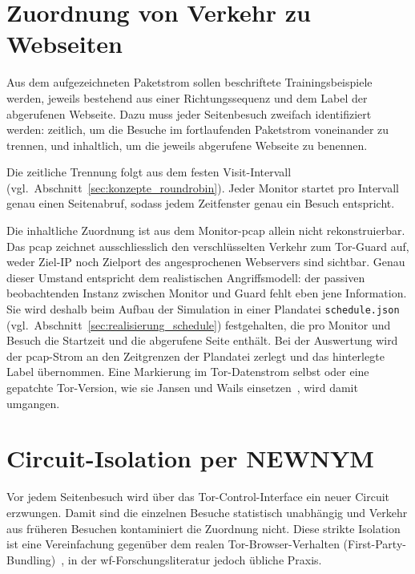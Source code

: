 \section{Zuordnung von Verkehr zu Webseiten}
\label{sec:konzepte_port_class}

Aus dem aufgezeichneten Paketstrom sollen beschriftete Trainingsbeispiele werden, jeweils bestehend aus einer Richtungssequenz und dem Label der abgerufenen Webseite.
Dazu muss jeder Seitenbesuch zweifach identifiziert werden: zeitlich, um die Besuche im fortlaufenden Paketstrom voneinander zu trennen, und inhaltlich, um die jeweils abgerufene Webseite zu benennen.

Die zeitliche Trennung folgt aus dem festen Visit-Intervall (vgl.\ Abschnitt~\ref{sec:konzepte_roundrobin}).
Jeder Monitor startet pro Intervall genau einen Seitenabruf, sodass jedem Zeitfenster genau ein Besuch entspricht.

Die inhaltliche Zuordnung ist aus dem Monitor-\gls{pcap} allein nicht rekonstruierbar.
Das \gls{pcap} zeichnet ausschliesslich den verschlüsselten Verkehr zum Tor-Guard auf, weder Ziel-IP noch Zielport des angesprochenen Webservers sind sichtbar.
Genau dieser Umstand entspricht dem realistischen Angriffsmodell: der passiven beobachtenden Instanz zwischen Monitor und Guard fehlt eben jene Information.
Sie wird deshalb beim Aufbau der Simulation in einer Plandatei \texttt{schedule.json} (vgl.\ Abschnitt~\ref{sec:realisierung_schedule}) festgehalten, die pro Monitor und Besuch die Startzeit und die abgerufene Seite enthält.
Bei der Auswertung wird der \gls{pcap}-Strom an den Zeitgrenzen der Plandatei zerlegt und das hinterlegte Label übernommen.
Eine Markierung im Tor-Datenstrom selbst oder eine gepatchte Tor-Version, wie sie Jansen und Wails einsetzen~\cite{jansen2023data}, wird damit umgangen.


\section{Circuit-Isolation per NEWNYM}
\label{sec:konzepte_newnym}

Vor jedem Seitenbesuch wird über das Tor-Control-Interface ein neuer Circuit erzwungen.
Damit sind die einzelnen Besuche statistisch unabhängig und Verkehr aus früheren Besuchen kontaminiert die Zuordnung nicht.
Diese strikte Isolation ist eine Vereinfachung gegenüber dem realen Tor-Browser-Verhalten (First-Party-Bundling)~\cite{jansen2023data}, in der \gls{wf}-Forschungsliteratur jedoch übliche Praxis.

